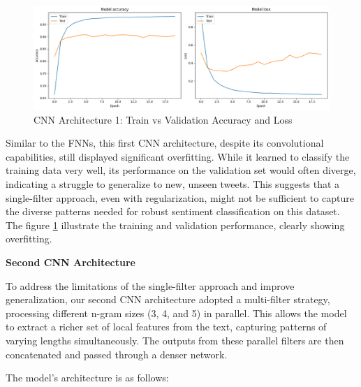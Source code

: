 \begin{figure}[h!]
    \centering
    \includegraphics[width=1\linewidth]{images/cnn1-acc.png}
\caption{CNN Architecture 1: Train vs Validation Accuracy and Loss}
    \label{fig:cnn-acc-1}
\end{figure}

Similar to the FNNs, this first CNN architecture, despite its convolutional capabilities, still displayed significant overfitting. While it learned to classify the training data very well, its performance on the validation set would often diverge, indicating a struggle to generalize to new, unseen tweets. This suggests that a single-filter approach, even with regularization, might not be sufficient to capture the diverse patterns needed for robust sentiment classification on this dataset. The  figure \ref{fig:cnn-acc-1} illustrate the training and validation performance, clearly showing overfitting.

\textbf{Second CNN Architecture}

To address the limitations of the single-filter approach and improve generalization, our second CNN architecture adopted a multi-filter strategy, processing different n-gram sizes (3, 4, and 5) in parallel. This allows the model to extract a richer set of local features from the text, capturing patterns of varying lengths simultaneously. The outputs from these parallel filters are then concatenated and passed through a denser network.

The model's architecture is as follows:

